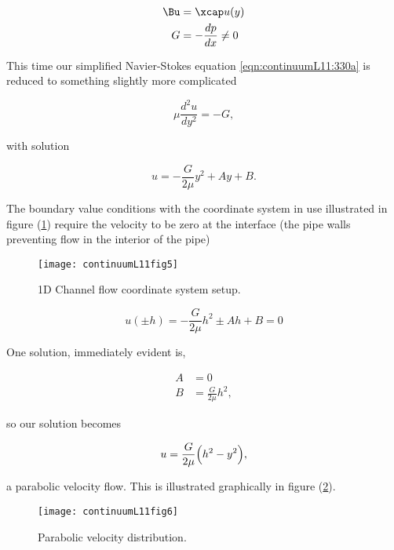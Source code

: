 \begin{align}\label{eqn:continuumL11:570}
\Bu &= \xcap u(y) \\
G &= - \frac{dp}{dx} \ne 0
\end{align}

This time our simplified Navier-Stokes equation \ref{eqn:continuumL11:330a} is reduced to something slightly more complicated

\begin{equation}\label{eqn:continuumL11:590}
\mu \frac{d^2 u}{dy^2} = -G,
\end{equation}

with solution

\begin{equation}\label{eqn:continuumL11:610}
u = -\frac{G}{2 \mu} y^2 + A y + B.
\end{equation}

The boundary value conditions with the coordinate system in use illustrated in figure (\ref{fig:continuumL11:continuumL11fig5}) require the velocity to be zero at the interface (the pipe walls preventing flow in the interior of the pipe)

\begin{figure}[htp]
   \centering
   \texttt{[image: continuumL11fig5]}
   \caption{1D Channel flow coordinate system setup.}\label{fig:continuumL11:continuumL11fig5}
\end{figure}

\begin{equation}\label{eqn:continuumL11:630}
u(\pm h) = 
-\frac{G}{2 \mu} h^2 \pm A h + B = 0
\end{equation}

One solution, immediately evident is,

\begin{align}\label{eqn:continuumL11:650}
A &= 0 \\
B &= \frac{G}{2 \mu} h^2,
\end{align}

so our solution becomes

\begin{equation}\label{eqn:continuumL11:690}
u = \frac{G}{2 \mu} \Bigl( h^2 - y^2 \Bigr),
\end{equation}

a parabolic velocity flow.  This is illustrated graphically in figure (\ref{fig:continuumL11:continuumL11fig6}).

\begin{figure}[htp]
   \centering
   \texttt{[image: continuumL11fig6]}
   \caption{Parabolic velocity distribution.}\label{fig:continuumL11:continuumL11fig6}
\end{figure}

